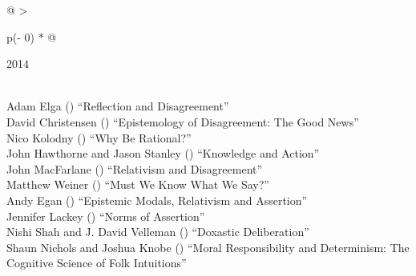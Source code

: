 \documentclass[
  10pt,
  letterpaper,
  DIV=11,
  numbers=noendperiod,
  twoside]{scrartcl}
\begin{document}
\begin{longtable}[]{@{}
  >{\raggedright\arraybackslash}p{(\columnwidth - 0\tabcolsep) * }@{}}

\caption{\label{tbl-top-ten-2005}Most cited articles published less than
ten years ago as of 2014.}

\tabularnewline

\toprule\noalign{}
\begin{minipage}[b]{\linewidth}\raggedright
2014
\end{minipage} \\
\midrule\noalign{}
\endhead
\bottomrule\noalign{}
\endlastfoot
Adam Elga
()
``Reflection and Disagreement'' \\
David Christensen
()
``Epistemology of Disagreement: The Good News'' \\
Nico Kolodny
()
``Why Be Rational?'' \\
John Hawthorne and Jason Stanley
()
``Knowledge and Action'' \\
John MacFarlane
()
``Relativism and Disagreement'' \\
Matthew Weiner
()
``Must We Know What We Say?'' \\
Andy Egan
()
``Epistemic Modals, Relativism and Assertion'' \\
Jennifer Lackey
()
``Norms of Assertion'' \\
Nishi Shah and J. David Velleman
()
``Doxastic Deliberation'' \\
Shaun Nichols and Joshua Knobe
()
``Moral Responsibility and Determinism: The Cognitive Science of Folk
Intuitions'' \\

\end{longtable}
\end{document}
